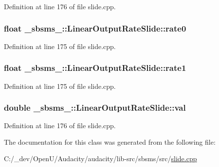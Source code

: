 Definition at line 176 of file slide.\+cpp.

\subsubsection[{\texorpdfstring{rate0}{rate0}}]{\setlength{\rightskip}{0pt plus 5cm}float \+\_\+sbsms\+\_\+\+::\+Linear\+Output\+Rate\+Slide\+::rate0\hspace{0.3cm}{\ttfamily [protected]}}\hypertarget{class__sbsms___1_1_linear_output_rate_slide_ae1501925a9805342f8da4b3631cb6e6d}{}\label{class__sbsms___1_1_linear_output_rate_slide_ae1501925a9805342f8da4b3631cb6e6d}


Definition at line 175 of file slide.\+cpp.

\subsubsection[{\texorpdfstring{rate1}{rate1}}]{\setlength{\rightskip}{0pt plus 5cm}float \+\_\+sbsms\+\_\+\+::\+Linear\+Output\+Rate\+Slide\+::rate1\hspace{0.3cm}{\ttfamily [protected]}}\hypertarget{class__sbsms___1_1_linear_output_rate_slide_a3e0bc730b2a18d5e4c3d55baa783fdb7}{}\label{class__sbsms___1_1_linear_output_rate_slide_a3e0bc730b2a18d5e4c3d55baa783fdb7}


Definition at line 175 of file slide.\+cpp.

\subsubsection[{\texorpdfstring{val}{val}}]{\setlength{\rightskip}{0pt plus 5cm}double \+\_\+sbsms\+\_\+\+::\+Linear\+Output\+Rate\+Slide\+::val\hspace{0.3cm}{\ttfamily [protected]}}\hypertarget{class__sbsms___1_1_linear_output_rate_slide_ab7ec36b148383b437c3044fc3a415d28}{}\label{class__sbsms___1_1_linear_output_rate_slide_ab7ec36b148383b437c3044fc3a415d28}


Definition at line 176 of file slide.\+cpp.



The documentation for this class was generated from the following file\+:\begin{DoxyCompactItemize}
\item 
C\+:/\+\_\+dev/\+Open\+U/\+Audacity/audacity/lib-\/src/sbsms/src/\hyperlink{slide_8cpp}{slide.\+cpp}\end{DoxyCompactItemize}
